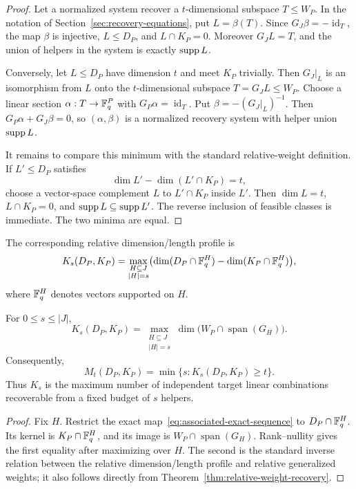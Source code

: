 \begin{proof}
Let a normalized system recover a $t$-dimensional subspace $T\leq W_P$.
In the notation of Section~\ref{sec:recovery-equations}, put $L=\beta(T)$.
Since $G_J\beta=-\operatorname{id}_T$, the map $\beta$ is injective,
$L\leq D_P$, and $L\cap K_P=0$.  Moreover $G_JL=T$, and the union of
helpers in the system is exactly $\operatorname{supp} L$.

Conversely, let $L\leq D_P$ have dimension $t$ and meet $K_P$ trivially.
Then $G_J|_L$ is an isomorphism from $L$ onto the $t$-dimensional subspace
$T=G_JL\leq W_P$.  Choose a linear section
$\alpha:T\to\mathbb F_q^P$ with $G_P\alpha=\operatorname{id}_T$.  Put
$\beta=-(G_J|_L)^{-1}$.  Then
$G_P\alpha+G_J\beta=0$, so $(\alpha,\beta)$ is a normalized recovery system
with helper union $\operatorname{supp} L$.

It remains to compare this minimum with the standard relative-weight
definition.  If $L'\leq D_P$ satisfies
\[
 \dim L'-\dim(L'\cap K_P)=t,
\]
choose a vector-space complement $L$ to $L'\cap K_P$ inside $L'$.  Then
$\dim L=t$, $L\cap K_P=0$, and $\operatorname{supp} L\subseteq\operatorname{supp} L'$.  The reverse
inclusion of feasible classes is immediate.  The two minima are equal.
%
%
\end{proof}

The corresponding relative dimension/length profile is
\[
 K_s(D_P,K_P)=
 \max_{\substack{H\subseteq J\\|H|=s}}
 \bigl(\dim(D_P\cap\mathbb F_q^H)-\dim(K_P\cap\mathbb F_q^H)\bigr),
\]
where $\mathbb F_q^H$ denotes vectors supported on $H$.

\begin{proposition}
\label{prop:relative-profile}
%
%
For $0\leq s\leq|J|$,
\[
 K_s(D_P,K_P)=
 \max_{\substack{H\subseteq J\\|H|=s}}
 \dim\bigl(W_P\cap\operatorname{span}(G_H)\bigr).
\]
Consequently,
\[
 M_t(D_P,K_P)=\min\{s:K_s(D_P,K_P)\geq t\}.
\]
Thus $K_s$ is the maximum number of independent target linear combinations
recoverable from a fixed budget of $s$ helpers.
\end{proposition}

\begin{proof}
Fix $H$.  Restrict the exact map~\eqref{eq:associated-exact-sequence} to
$D_P\cap\mathbb F_q^H$.  Its kernel is $K_P\cap\mathbb F_q^H$, and its image is
$W_P\cap\operatorname{span}(G_H)$.  Rank--nullity gives the first equality
after maximizing over $H$.  The second is the standard inverse relation
between the relative dimension/length profile and relative generalized
weights; it also follows directly from Theorem~\ref{thm:relative-weight-recovery}.
%
%
\end{proof}

